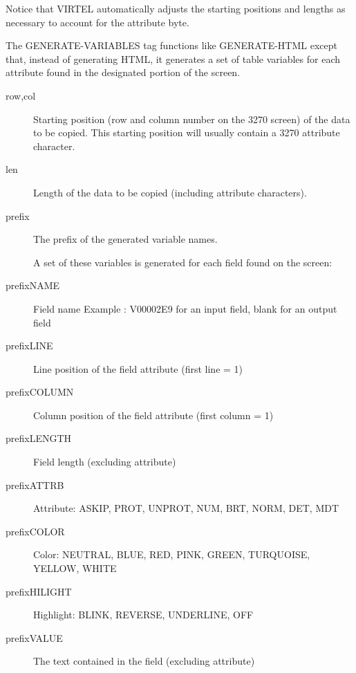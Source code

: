\documentclass[letterpaper,10pt,english]{sphinxmanual}
\begin{document}
Notice that VIRTEL automatically adjusts the starting positions and lengths as necessary to account for the attribute byte.


The GENERATE-VARIABLES tag functions like GENERATE-HTML except that, instead of generating HTML, it generates a set of table variables for each attribute found in the designated portion of the screen.

\begin{sphinxVerbatim}[commandchars=\\\{\}]
      
\end{sphinxVerbatim}
\begin{description}
\item[{row,col}] \leavevmode
Starting position (row and column number on the 3270 screen) of the data to be copied. This starting position will usually contain a 3270 attribute character.

\item[{len}] \leavevmode
Length of the data to be copied (including attribute characters).

\item[{prefix}] \leavevmode
The prefix of the generated variable names.

A set of these variables is generated for each field found on the screen:

\item[{prefixNAME}] \leavevmode
Field name
Example : V00002E9 for an input field, blank for an output field

\item[{prefixLINE}] \leavevmode
Line position of the field attribute (first line = 1)

\item[{prefixCOLUMN}] \leavevmode
Column position of the field attribute (first column = 1)

\item[{prefixLENGTH}] \leavevmode
Field length (excluding attribute)

\item[{prefixATTRB}] \leavevmode
Attribute: ASKIP, PROT, UNPROT, NUM, BRT, NORM, DET, MDT

\item[{prefixCOLOR}] \leavevmode
Color: NEUTRAL, BLUE, RED, PINK, GREEN, TURQUOISE, YELLOW, WHITE

\item[{prefixHILIGHT}] \leavevmode
Highlight: BLINK, REVERSE, UNDERLINE, OFF

\item[{prefixVALUE}] \leavevmode
The text contained in the field (excluding attribute)

\end{description}
\end{document}
